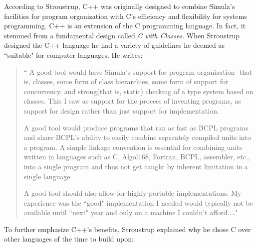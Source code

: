 According to Stroustrup, C++ was originally designed to combine Simula's facilities for program organization with C's efficiency and flexibility for systems programming\cite{stroustrup1996history}.  C++ is an extension of the C programming language. In fact, it stemmed from a fundamental design called \textit{C with Classes}\cite{stroustrup1996history}.  When Stroustrup designed the C++ language he had a variety of guidelines he deemed as ``suitable" for computer languages.  He writes:
\begin{quote}
\label{qt: StroustrupC++History}
\begin{enumerate}[label = {[\arabic*]}]
\item `` A good tool would have Simula's support for program organization- that is, classes, some form of class hierarchies, some form of support for concurrency, and strong(that is, static) checking of a type system based on classes.  This I saw as support for the process of inventing programs, as support for design rather than just support for implementation.

 \item A good tool would produce programs that ran as fast as BCPL programs and share BCPL's ability to easily combine separately compiled units into a program.  A simple linkage convention is essential for combining units written in languages such as C, Algol168, Fortran, BCPL, assembler, etc., into a single program and thus not get caught by inherent limitation in a single language

 \item A good tool should also allow for highly portable implementations.  My experience was the ``good" implementation I needed would typically not be available until ``next" year and only on a machine I couldn't afford....\cite{stroustrup1996history}"
\end{enumerate}
\end{quote}
To further emphasize C++'s benefits, Stroustrup explained why he chose C over other languages of the time to build upon:
